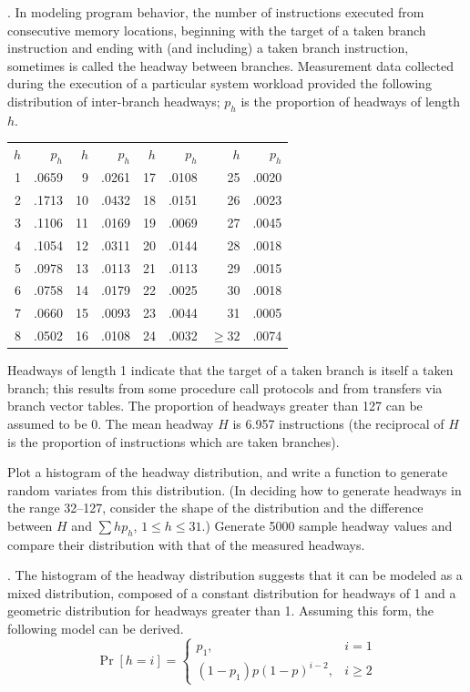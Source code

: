 . In modeling program behavior, the number of instructions executed
from consecutive memory locations, beginning with the target of a taken branch
instruction and ending with (and including) a taken branch instruction,
sometimes is called the headway between branches. Measurement data collected
during the execution of a particular system workload provided the following
distribution of inter-branch headways; $p_h$ is the proportion of headways of
length $h$.
\begin{center}
\begin{tabular}{rrrrrrrr}
$h$ & $p_h$ & $h$ & $p_h$ & $h$ & $p_h$ & $h$ & $p_h$\\
1 & .0659 & 9 & .0261 & 17 & .0108 & 25 & .0020\\
2 & .1713 & 10 & .0432 & 18 & .0151 & 26 & .0023\\
3 & .1106 & 11 & .0169 & 19 & .0069 & 27 & .0045\\
4 & .1054 & 12 & .0311 & 20 & .0144 & 28 & .0018\\
5 & .0978 & 13 & .0113 & 21 & .0113 & 29 & .0015\\
6 & .0758 & 14 & .0179 & 22 & .0025 & 30 & .0018\\
7 & .0660 & 15 & .0093 & 23 & .0044 & 31 & .0005\\
8 & .0502 & 16 & .0108 & 24 & .0032 & $\geq32$ & .0074
\end{tabular}
\end{center}
Headways of length 1 indicate that the target of a taken branch is itself a taken
branch; this results from some procedure call protocols and from transfers via
branch vector tables. The proportion of headways greater than 127 can be assumed
to be 0. The mean headway $H$ is 6.957 instructions (the reciprocal of $H$ is the
proportion of instructions which are taken branches).

Plot a histogram of the headway distribution, and write a function to generate
random variates from this distribution. (In deciding how to generate headways in
the range 32--127, consider the shape of the distribution and the difference
between $H$ and $\sum hp_h$, $1\leq h\leq31$.) Generate 5000 sample headway
values and compare their distribution with that of the measured headways.

. The histogram of the headway distribution suggests that it can be
modeled as a mixed distribution, composed of a constant distribution for
headways of 1 and a geometric distribution for headways greater than 1. Assuming
this form, the following model can be derived.
\begin{equation}
\Pr[h=i]=\begin{cases}
p_1, & i=1\\
(1-p_1)p(1-p)^{i-2}, & i\geq2
\end{cases}
\end{equation}

